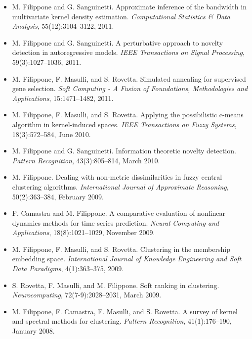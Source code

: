 \begin{itemize}
\item  M. Filippone and G. Sanguinetti. Approximate inference of the bandwidth in multivariate kernel density estimation. \emph{Computational Statistics \& Data Analysis}, 55(12):3104--3122, 2011.  
\item  M. Filippone and G. Sanguinetti. A perturbative approach to novelty detection in autoregressive models. \emph{IEEE Transactions on Signal Processing}, 59(3):1027--1036, 2011.  
\item  M. Filippone, F. Masulli, and S. Rovetta. Simulated annealing for supervised gene selection. \emph{Soft Computing - A Fusion of Foundations, Methodologies and Applications}, 15:1471--1482, 2011.  
\item  M. Filippone, F. Masulli, and S. Rovetta. Applying the possibilistic c-means algorithm in kernel-induced spaces. \emph{IEEE Transactions on Fuzzy Systems}, 18(3):572--584, June 2010.  
\item  M. Filippone and G. Sanguinetti. Information theoretic novelty detection. \emph{Pattern Recognition}, 43(3):805--814, March 2010.  
\item  M. Filippone. Dealing with non-metric dissimilarities in fuzzy central clustering algorithms. \emph{International Journal of Approximate Reasoning}, 50(2):363--384, February 2009.  
\item  F. Camastra and M. Filippone. A comparative evaluation of nonlinear dynamics methods for time series prediction. \emph{Neural Computing and Applications}, 18(8):1021--1029, November 2009.  
\item  M. Filippone, F. Masulli, and S. Rovetta. Clustering in the membership embedding space. \emph{International Journal of Knowledge Engineering and Soft Data Paradigms}, 4(1):363--375, 2009.  
\item  S. Rovetta, F. Masulli, and M. Filippone. Soft ranking in clustering. \emph{Neurocomputing}, 72(7-9):2028--2031, March 2009.  
\item  M. Filippone, F. Camastra, F. Masulli, and S. Rovetta. A survey of kernel and spectral methods for clustering. \emph{Pattern Recognition}, 41(1):176--190, January 2008.  


\end{itemize}
